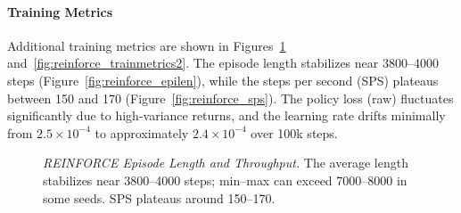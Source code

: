 \paragraph{Training Metrics}
Additional training metrics are shown in Figures~\ref{fig:reinforce_trainmetrics1} and~\ref{fig:reinforce_trainmetrics2}. The episode length stabilizes near \num{3800}–\num{4000} steps (Figure~\ref{fig:reinforce_epilen}), while the steps per second (SPS) plateaus between 150 and 170 (Figure~\ref{fig:reinforce_sps}). The policy loss (raw) fluctuates significantly due to high-variance returns, and the learning rate drifts minimally from $2.5\times10^{-4}$ to approximately $2.4\times10^{-4}$ over 100k steps.
\begin{figure}
	\centering
	\quad
	\caption{\textit{REINFORCE Episode Length and Throughput.} 
		The average length stabilizes near 3800–4000 steps; 
		min–max can exceed 7000–8000 in some seeds. 
		SPS plateaus around 150–170.}
	\label{fig:reinforce_trainmetrics1}
\end{figure}

